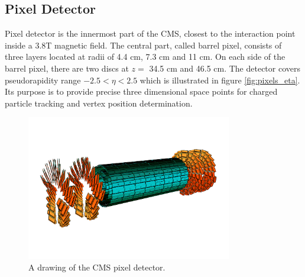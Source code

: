 \subsection{Pixel Detector}

Pixel detector is the innermost part of the CMS, closest to the interaction point inside a 3.8T magnetic field. The central part, called barrel pixel, consists of three layers located at radii of 4.4 cm, 7.3 cm and 11 cm. On each side of the barrel pixel, there are two discs at $z=$ 34.5 cm and 46.5 cm. The detector covers pseudorapidity range $-2.5<\eta<2.5$ which is illustrated in figure \ref{fig:pixels_eta}. Its purpose is to provide precise three dimensional space points for charged particle tracking and vertex position determination.
\begin{figure}[htbp]
	\centering
		\includegraphics[width=0.8\textwidth]{Figures/pixel_detector.png}
	\caption[CMS Pixel Detector]{A drawing of the CMS pixel detector. \cite{Chatrchyan:2008aa}}
	\label{fig:pixels}
\end{figure}
